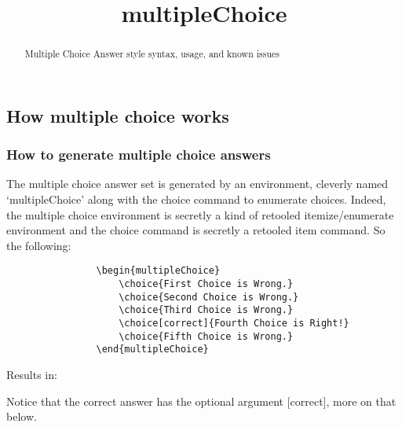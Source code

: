 \documentclass{ximera}
\title{multipleChoice}
\begin{document}
\begin{abstract}
    Multiple Choice Answer style syntax, usage, and known issues 
\end{abstract}
\maketitle

    \subsection*{How multiple choice works}
    
    
        \subsubsection*{How to generate multiple choice answers}
        
            The multiple choice answer set is generated by an environment, cleverly named `multipleChoice' along with the choice command to enumerate choices. Indeed, the multiple choice environment is secretly a kind of retooled itemize/enumerate environment and the choice command is secretly a retooled item command. So the following:
            \begin{verbatim}
                \begin{multipleChoice}
                    \choice{First Choice is Wrong.}
                    \choice{Second Choice is Wrong.}
                    \choice{Third Choice is Wrong.}
                    \choice[correct]{Fourth Choice is Right!}
                    \choice{Fifth Choice is Wrong.}
                \end{multipleChoice}
            \end{verbatim}
            Results in:
            \begin{multipleChoice}
            \end{multipleChoice}
            
            Notice that the correct answer has the optional argument [correct], more on that below.
            
\end{document}
